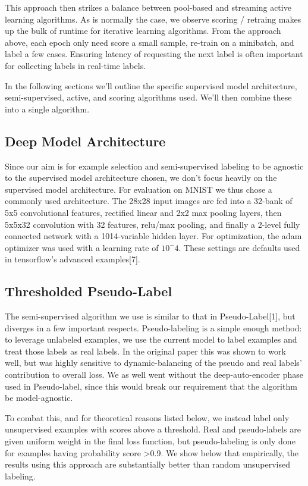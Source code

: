 \documentclass{article}
\begin{document}
This approach then strikes a balance between pool-based and streaming active learning algorithms.  As is normally the case, we observe scoring / retraing makes up the bulk of runtime for iterative learning algorithms.  From the approach above, each epoch only need score a small sample, re-train on a minibatch, and label a few cases.  Ensuring latency of requesting the next label is often important for collecting labels in real-time labels.  

In the following sections we'll outline the specific supervised model architecture, semi-supervised, active, and scoring algorithms used.  We'll then combine these into a single algorithm.  

\subsection{Deep Model Architecture}
Since our aim is for example selection and semi-supervised labeling to be agnostic to the supervised model architecture chosen, we don't focus heavily on the supervised model architecture.  For evaluation on MNIST we thus chose a commonly used architecture.  The 28x28 input images are fed into a 32-bank of 5x5 convolutional features, rectified linear and 2x2 max pooling layers, then 5x5x32 convolution with 32 features, relu/max pooling, and finally a 2-level fully connected network with a 1014-variable hidden layer.  For optimization, the adam optimizer was used with a learning rate of $10^-4$.  These settings are defaults used in tensorflow's advanced examples[7].

\subsection{Thresholded Pseudo-Label}
The semi-supervised algorithm we use is similar to that in Pseudo-Label[1], but diverges in a few important respects.  Pseudo-labeling is a simple enough method: to leverage unlabeled examples, we use the current model to label examples and treat those labels as real labels.  In the original paper this was shown to work well, but was highly sensitive to dynamic-balancing of the pseudo and real labels' contribution to overall loss.  We as well went without the deep-auto-encoder phase used in Pseudo-label, since this would break our requirement that the algorithm be model-agnostic.  

To combat this, and for theoretical reasons listed below, we instead label only unsupervised examples with scores above a threshold.  Real and pseudo-labels are given uniform weight in the final loss function, but pseudo-labeling is only done for examples having probability score >0.9.  We show below that empirically, the results using this approach are substantially better than random unsupervised labeling.  
\end{document}

